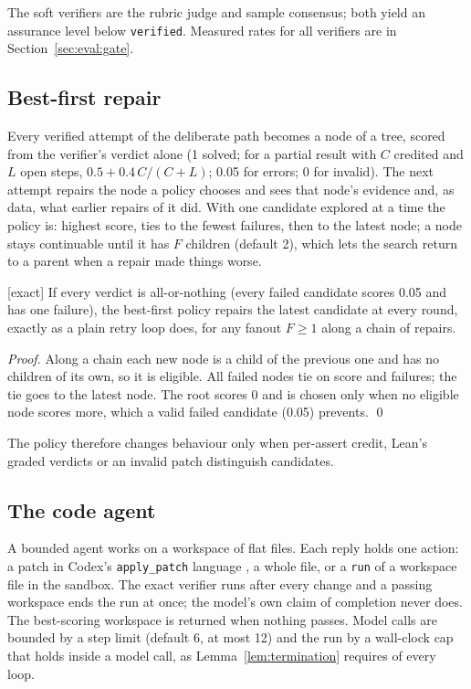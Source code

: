 The soft verifiers are the rubric judge and sample consensus; both yield an
assurance level below \texttt{verified}. Measured rates for all verifiers are
in Section~\ref{sec:eval:gate}.

\subsection{Best-first repair}
Every verified attempt of the deliberate path becomes a node of a tree, scored
from the verifier's verdict alone (1 solved; for a partial result with $C$
credited and $L$ open steps, $0.5+0.4\,C/(C+L)$; 0.05 for errors; 0 for
invalid). The next attempt repairs the node a policy chooses and sees that
node's evidence and, as data, what earlier repairs of it did. With one
candidate explored at a time the policy is: highest score, ties to the fewest
failures, then to the latest node; a node stays continuable until it has $F$
children (default 2), which lets the search return to a parent when a repair
made things worse.

\begin{proposition} \textnormal{[exact]}
\label{prop:h1}
If every verdict is all-or-nothing (every failed candidate scores 0.05 and has
one failure), the best-first policy repairs the latest candidate at every round,
exactly as a plain retry loop does, for any fanout $F\ge1$ along a chain of
repairs.
\end{proposition}
\begin{proof}
Along a chain each new node is a child of the previous one and has no children
of its own, so it is eligible. All failed nodes tie on score and failures; the
tie goes to the latest node. The root scores 0 and is chosen only when no
eligible node scores more, which a valid failed candidate (0.05) prevents. \qed
\end{proof}
The policy therefore changes behaviour only when per-assert credit, Lean's
graded verdicts or an invalid patch distinguish candidates.

\subsection{The code agent}
A bounded agent works on a workspace of flat files. Each reply holds one
action: a patch in Codex's \texttt{apply\_patch} language
\cite{openaicodex2026}, a whole file, or a \texttt{run} of a workspace file in
the sandbox. The exact verifier runs after every change and a passing
workspace ends the run at once; the model's own claim of completion never
does. The best-scoring workspace is returned when nothing passes. Model calls
are bounded by a step limit (default 6, at most 12) and the run by a
wall-clock cap that holds inside a model call, as Lemma~\ref{lem:termination}
requires of every loop.

